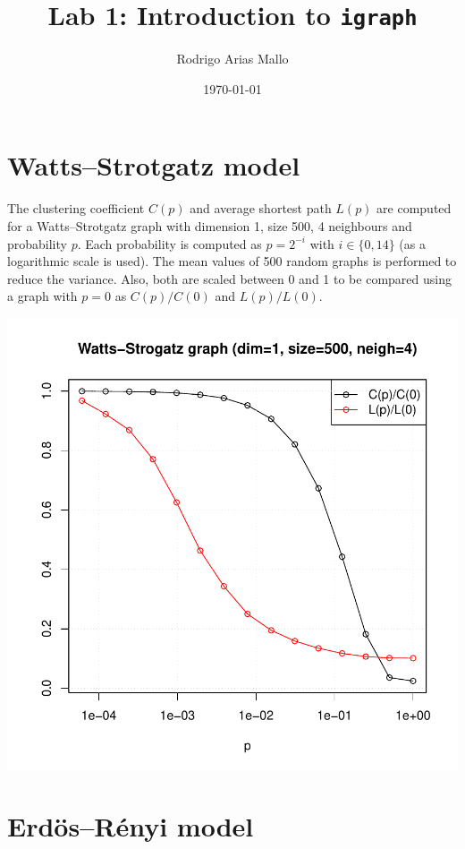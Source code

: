 \documentclass[a4paper]{article}
\title{Lab 1: Introduction to \texttt{igraph}}
\author{Rodrigo Arias Mallo}
\date{\today}
\begin{document}
\maketitle

\section{Watts--Strotgatz model}

The clustering coefficient $C(p)$ and average shortest path $L(p)$ are computed 
for a Watts--Strotgatz graph with dimension 1, size 500, 4 neighbours and 
probability $p$. Each probability is computed as $p = 2^{-i}$ with $i \in \{0, 
14\}$ (as a logarithmic scale is used). The mean values of 500 random graphs is 
performed to reduce the variance. Also, both are scaled between 0 and 1 to be 
compared using a graph with $p=0$ as $C(p)/C(0)$ and $L(p)/L(0)$.

\begin{center}
\includegraphics[width=.8\textwidth]{ws.pdf}
\end{center}

\newpage
\section{Erdös--Rényi model}
\end{document}
